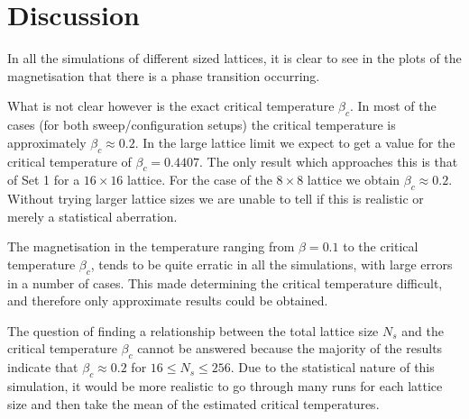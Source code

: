 \documentclass[a4paper]{IEEEtran}
\newcommand{\showcode}[1]{\begin{mdframed}[style=code] %
                          \end{mdframed}%
}
\begin{document}

\section{Discussion}

    In all the simulations of different sized lattices, it is
    clear to see in the plots of the magnetisation that there is a phase
    transition occurring.

    What is not clear however is the exact critical temperature $\beta_c$.
    In most of the cases (for both sweep/configuration setups) the
    critical temperature is approximately $\beta_c \approx 0.2$.
    In the large lattice limit we expect to get a value for the critical
    temperature of $\beta_c = 0.4407$. The only result which approaches
    this is that of Set 1 for a $16 \times 16$ lattice. For the case
    of the $8 \times 8$ lattice we obtain $\beta_c \approx 0.2$.
    Without trying
    larger lattice sizes we are unable to tell if this is realistic
    or merely a statistical aberration.

    The magnetisation in the temperature ranging from $\beta = 0.1$ to 
    the critical temperature $\beta_c$, tends to be quite erratic
    in all the simulations, with large errors in a number of cases.
    This made determining the critical temperature difficult, and
    therefore only approximate results could be obtained.

    The question of finding a relationship between the total lattice
    size $N_s$ and the critical temperature $\beta_c$ cannot be answered
    because the majority of the results indicate that $\beta_c \approx 0.2$
    for $16 \le N_s \le 256 $.
    Due to the statistical nature of this simulation, it would be more
    realistic to go through many runs for each lattice size and then
    take the mean of the estimated critical temperatures.




    \onecolumn
    \showcode{ising.f} 
\end{document}
